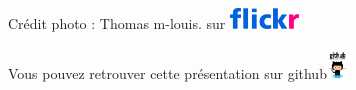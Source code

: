 \documentclass[newPxFont]{beamer}
\begin{document}
{
%
\begin{frame}
  \vspace{-1em}  
  \begin{minipage}[t][.8\textheight]{\textwidth}

    \vfill

  \hfill \small{Crédit photo : Thomas m-louis. sur \includegraphics[height=0.55cm]{img/flickr_logo}}
  \end{minipage}
  \vspace{-3em}
  \centering
	Vous pouvez retrouver cette présentation sur github\includegraphics[height=0.85cm]{img/github}  
  
\end{frame}
}
\end{document}
